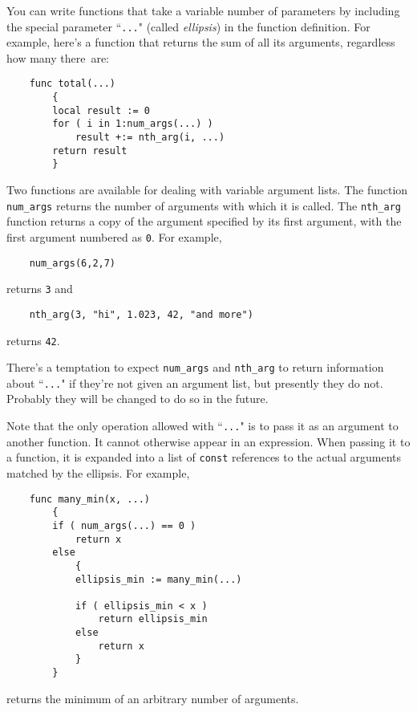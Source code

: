 You can write functions that take a variable number of parameters
by including the special parameter
``{\tt ...}" (called {\em ellipsis})
in the function definition.
For example, here's a function that returns the sum of all its arguments,
regardless how many there~are:
\begin{verbatim}
    func total(...)
        {
        local result := 0
        for ( i in 1:num_args(...) )
            result +:= nth_arg(i, ...)
        return result
        }
\end{verbatim}

Two functions are available for dealing with variable argument lists.
The function {\tt num\_args} \label{num_args-func}
returns the number of arguments with which it is called.
The {\tt nth\_arg} \label{nth_arg-func} function 
returns a copy of the argument specified by its first
argument, with the first argument numbered as {\tt 0}.  For example,
\begin{verbatim}
    num_args(6,2,7)
\end{verbatim}
returns {\tt 3} and
\begin{verbatim}
    nth_arg(3, "hi", 1.023, 42, "and more")
\end{verbatim}
returns {\tt 42}.

There's a temptation to expect {\tt num\_args} and {\tt nth\_arg} to
return information about ``{\tt ...}" if they're not given an argument
list, but presently they do not.  Probably they will be changed to
do so in the future.

Note that the only operation allowed with ``{\tt ...}" is to pass it
as an argument to another function.  It cannot otherwise appear in
an expression.  When passing it to a function, it is expanded into
a list of {\tt const} references to the actual arguments matched
by the ellipsis.  For example,
\begin{verbatim}
    func many_min(x, ...)
        {
        if ( num_args(...) == 0 )
            return x
        else
            {
            ellipsis_min := many_min(...)

            if ( ellipsis_min < x )
                return ellipsis_min
            else
                return x
            }
        }
\end{verbatim}
returns the minimum of an arbitrary number of arguments.

